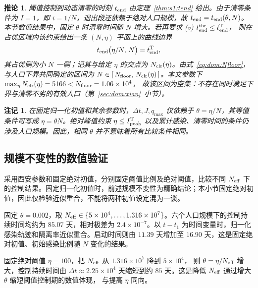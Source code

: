 \documentclass[lang=cn,a4paper,newtx]{elegantpaper}
\numberwithin{equation}{section}
\theoremstyle{plain}
\newtheorem{corollaryn}[theorem]{推论}
\newtheorem{remarkn}[theorem]{注记}
\begin{document}
\begin{corollaryn}\label{cor:clr}
阈值控制到动态清零的时刻 $t_{\rm end}$ 由定理~\ref{thm:s1:tend} 给出。由于清零条件为 $I=1$，即 $i=1/N$，退出段还依赖于绝对人口规模，故 $t_{\rm end}=t_{\rm end}(\theta,N)$。本节数值结果中，固定 $\theta$ 时清零时间随 $N$ 增大。若再要求
(v) $t_{\rm end}^{\rm thr}\le t_{\rm end}^{\rm T}$，
则在占优区域内该约束给出一条 $(N,\eta)$ 平面上的曲线边界
\begin{equation}
  t_{\rm end}\big(\eta/N,\,N\big)=t_{\rm end}^{\rm T},
  \label{eq:dom:clrarc}
\end{equation}
其占优侧为小 $N$ 一侧；记其与给定 $\eta$ 的交点为 $N_{\rm clr}(\eta)$。由式~\eqref{eq:dom:Nfloor}，
与人口下界共同确定的区间为 $N\in[\,N_{\rm floor},\,N_{\rm clr}(\eta)\,]$。本文参数下
$\max_\eta N_{\rm clr}(\eta)=5166<N_{\rm floor}=1.06\times10^{4}$，
故该区间为空集：不存在同时满足下界与清零不劣的有效人口（第~\ref{sec:dom:xian}~小节）。
\end{corollaryn}

\begin{remarkn}\label{rem:dom:dichotomy}
在固定归一化初值和其余参数时，$\Delta t,J,q_{\max}$ 仅依赖于 $\theta=\eta/N$，其等值条件可写成 $\eta=\theta N$。绝对峰值约束 $\eta\le I_{\rm peak}^{\rm T}$ 以及累计感染、清零时间的条件仍涉及人口规模。因此，相同 $\theta$ 并不意味着所有比较条件相同。
\end{remarkn}

\subsection{规模不变性的数值验证}
\label{sec:scaling}

采用西安参数和固定绝对初值，分别固定阈值比例及绝对阈值，比较不同 $N_{\rm eff}$ 下的控制结果。固定归一化初值时，前述规模不变性为精确结论；本小节固定绝对初值，因此仅检验近似重合，不能将两种初值设定混为一谈。

固定 $\theta=0.002$，取 $N_{\rm eff}\in\{5\times10^4,\dots,1.316\times10^7\}$。六个人口规模下的控制持续时间均约为 $85.07$ 天，相对极差为 $2.4\times10^{-7}$。以 $t-t_1$ 为时间变量时，归一化感染轨迹和隔离率近似重合。启动时间则由 $11.39$ 天增加至 $16.90$ 天，这是固定绝对初值、初始感染比例随 $N$ 变化的结果。

固定绝对阈值 $\eta=100$，把 $N_{\rm eff}$ 从 $1.316\times10^7$ 降到 $5\times10^{4}$，
则 $\theta=\eta/N_{\rm eff}$ 增大，控制持续时间由 $\Delta t\approx2.25\times10^4$ 天缩短到约
$85$ 天。这是降低 $N_{\rm eff}$ 通过增大 $\theta$ 缩短阈值控制期的数值体现，
与提高 $\eta$ 同向。
\end{document}

